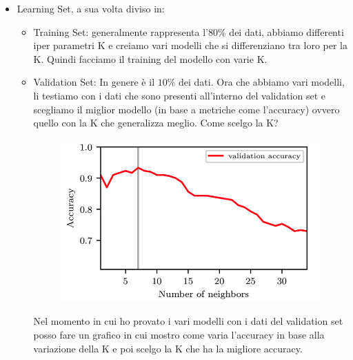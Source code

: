 \documentclass[14pt]{extreport}
\begin{document}
\begin{itemize}
	\item Learning Set, a sua volta diviso in:
		\begin{itemize}
		\item Training Set: generalmente rappresenta l’$80\%$ dei dati, abbiamo differenti iper parametri K e creiamo vari modelli che si differenziano tra loro per la K. Quindi facciamo il training del modello con varie K.
		\item Validation Set: In genere è il $10\%$ dei dati. Ora che abbiamo vari modelli, li testiamo con i dati che sono presenti all’interno del validation set e scegliamo il miglior modello (in base a metriche come l’accuracy) ovvero quello con la K che generalizza meglio.
		Come scelgo la K?
		
\begin{figure}[H] 
	\centering
	\includegraphics[width=0.7\linewidth]{454.jpeg}
	\end{figure}
	Nel momento in cui ho provato i vari modelli con i dati del validation set posso fare un grafico in cui mostro come varia l’accuracy in base alla variazione della K e poi scelgo la K che ha la migliore accuracy.


\end{itemize}
\end{itemize}
\end{document}
